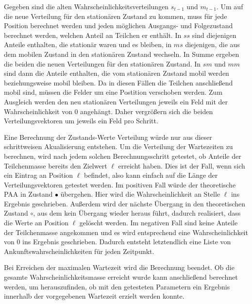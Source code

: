 Gegeben sind die alten Wahrscheinlichkeitsverteilungen $s_{t-1}$ und $m_{t-1}$.
Um auf die neue Verteilung für den stationären Zustand zu kommen, muss für jede Position berechnet werden und jeden möglichen Ausgangs- und Folgezustand berechnet werden, welchen Anteil an Teilchen er enthält. 
In $ss$ sind diejenigen Anteile enthalten, die stationär waren und es bleiben, in $ms$ diejenigen, die aus dem mobilen Zustand in den stationären Zustand wechseln. In Summe ergeben die beiden die neuen Verteilungen für den stationären Zustand.
In $sm$ und $mm$ sind dann die Anteile enthalten, die vom stationären Zustand mobil werden beziehungsweise mobil bleiben. Da in diesen Fällen die Teilchen anschließend mobil sind, müssen die Felder um eine Postition verschoben werden. Zum Ausgleich werden den neu stationären Verteilungen jeweils ein Feld mit der Wahrscheinlichkeit von $0$ angehängt.
Daher vergrößern sich die beiden Verteilungsvektoren um jeweils ein Feld pro Schritt.

Eine Berechnung der Zustands-Werte Verteilung würde nur aus dieser schrittweisen Akualisierung entstehen. Um die Verteilung der Wartezeiten zu berechnen, wird nach jedem solchen Berechnungsschritt getestet, ob Anteile der Teilchenmasse bereits den Zielwert $\ell$ erreicht haben. Dies ist der Fall, wenn sich ein Eintrag an Position $\ell$ befindet, also kann einfach auf die Länge der Verteilungsvektoren getestet werden. Im positiven Fall würde der theoretische PAA in Zustand $\bullet$ übergehen. Hier wird die Wahrscheinlichkeit an Stelle $\ell$ ins Ergebnis geschrieben. Außerdem wird der nächste Übergang in den theoretischen Zustand $\circ$, aus dem kein Übergang wieder heraus führt, dadurch realisiert, dass die Werte an Position $\ell$ gelöscht werden.
Im negativen Fall sind keine Anteile der Teilchenmasse angekommen und es wird entsprechend eine Wahrscheinlichkeit von $0$ ins Ergebnis geschrieben.
Dadurch entsteht letztendlich eine Liste von Ankunftswahrscheinlichkeiten für jeden Zeitpunkt.

Bei Erreichen der maximalen Wartezeit wird die Berechnung beendet. Ob die gesamte Wahrscheinlichkeitsmasse erreicht wurde kann anschließend berechnet werden, um herauszufinden, ob mit den getesteten Parametern ein Ergebnis innerhalb der vorgegebenen Wartezeit erzielt werden konnte. 

